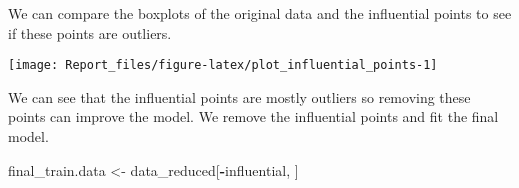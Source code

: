 \documentclass[
]{article}
\newenvironment{Shaded}{\begin{snugshade}}{\end{snugshade}}
\newcommand{\AttributeTok}[1]{\textcolor[rgb]{0.13,0.29,0.53}{#1}}
\newcommand{\ConstantTok}[1]{\textcolor[rgb]{0.56,0.35,0.01}{#1}}
\newcommand{\DecValTok}[1]{\textcolor[rgb]{0.00,0.00,0.81}{#1}}
\newcommand{\FunctionTok}[1]{\textcolor[rgb]{0.13,0.29,0.53}{\textbf{#1}}}
\newcommand{\NormalTok}[1]{#1}
\newcommand{\OtherTok}[1]{\textcolor[rgb]{0.56,0.35,0.01}{#1}}
\newcommand{\SpecialCharTok}[1]{\textcolor[rgb]{0.81,0.36,0.00}{\textbf{#1}}}
\begin{document}
We can compare the boxplots of the original data and the influential
points to see if these points are outliers.

\begin{center}\texttt{[image: Report\_files/figure-latex/plot\_influential\_points-1]} \end{center}

We can see that the influential points are mostly outliers so removing
these points can improve the model. We remove the influential points and
fit the final model.

\begin{Shaded}
\begin{Highlighting}[]
\NormalTok{final\_train.data }\OtherTok{\textless{}{-}}\NormalTok{ data\_reduced[}\SpecialCharTok{{-}}\NormalTok{influential, ]}
\end{Highlighting}
\end{Shaded}

\begin{Shaded}
\end{Shaded}
\end{document}
